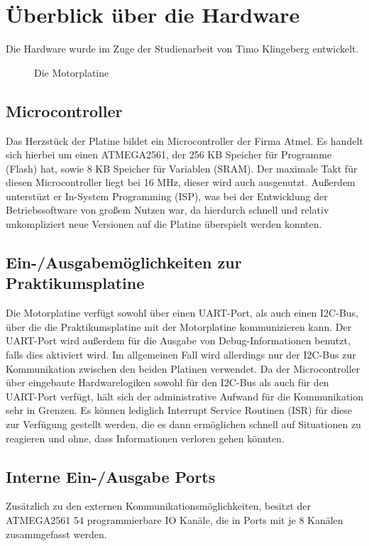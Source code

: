 \chapter{Überblick über die Hardware}

Die Hardware wurde im Zuge der Studienarbeit von Timo Klingeberg \cite{STUD_TIMO}
entwickelt.
\begin{figure}[htb]
 \centering
 \caption{\label{board}Die Motorplatine}
\end{figure}
\section{Microcontroller}
Das Herzstück der Platine bildet ein Microcontroller der Firma Atmel.
Es handelt sich hierbei um einen ATMEGA2561\cite{ATMEGA_MANUAL}, der 256 KB Speicher für
Programme (Flash) hat, sowie 8 KB Speicher für Variablen (SRAM). Der maximale Takt für
diesen Microcontroller liegt bei 16 MHz, dieser wird auch ausgenutzt. Außerdem unterstüzt
er In-System Programming (ISP), was bei der Entwicklung der Betriebssoftware von großem
Nutzen war, da hierdurch schnell und relativ unkompliziert neue Versionen auf die Platine
überspielt werden konnten.
\section{Ein-/Ausgabemöglichkeiten zur Praktikumsplatine}
Die Motorplatine verfügt sowohl über einen UART-Port, als auch einen I2C-Bus, über die
die Praktikumsplatine mit der Motorplatine kommunizieren kann. Der UART-Port wird außerdem
für die Ausgabe von Debug-Informationen benutzt, falls dies aktiviert wird. Im allgemeinen
Fall wird allerdings nur der I2C-Bus zur Kommunikation zwischen den beiden Platinen verwendet.
Da der Microcontroller über eingebaute Hardwarelogiken sowohl für den I2C-Bus als auch für
den UART-Port verfügt, hält sich der administrative Aufwand für die Kommunikation sehr in
Grenzen. Es können lediglich Interrupt Service Routinen (ISR) für diese zur Verfügung gestellt
werden, die es dann ermöglichen schnell auf Situationen zu reagieren und ohne, dass
Informationen verloren gehen könnten.
\section{Interne Ein-/Ausgabe Ports}
Zusätzlich zu den externen Kommunikationsmöglichkeiten, besitzt der ATMEGA2561 54
programmierbare IO Kanäle, die in Ports mit je 8 Kanälen zusammgefasst werden.
